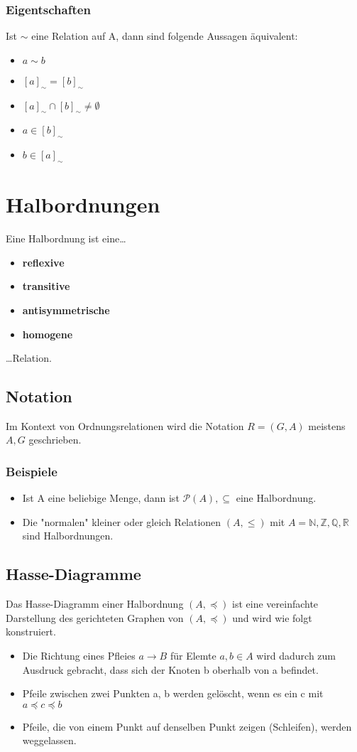 \subsubsection{Eigentschaften}
Ist $\sim$ eine Relation auf A, dann sind folgende Aussagen äquivalent:
\begin{itemize}
    \item $a \sim b$
    \item $[a]_{\sim} = [b]_{\sim}$
    \item $[a]_{\sim} \cap [b]_{\sim} \neq \emptyset$
    \item $a \in [b]_{\sim}$
    \item $b \in [a]_{\sim}$
\end{itemize}
\section{Halbordnungen}
Eine Halbordnung ist eine\dots
\begin{itemize}
    \item \textbf{reflexive}
    \item \textbf{transitive}
    \item \textbf{antisymmetrische}
    \item \textbf{homogene}
\end{itemize}
\dots Relation.
\subsection{Notation}
Im Kontext von Ordnungsrelationen wird die Notation $R = (G,A)$ meistens $A,G$ geschrieben.
\subsubsection{Beispiele}
\begin{itemize}
    \item Ist A eine beliebige Menge, dann ist $\mathcal{P}(A),\subseteq$ eine Halbordnung.
    \item Die "normalen" kleiner oder gleich Relationen $(A,\leq)$ mit $A=\mathbb{N,Z,Q,R}$ sind Halbordnungen.
\end{itemize}
\subsection{Hasse-Diagramme}
Das Hasse-Diagramm einer Halbordnung $(A, \preceq)$ ist eine
vereinfachte Darstellung des gerichteten Graphen von $(A, \preceq)$ und
wird wie folgt konstruiert.
\begin{itemize}
    \item Die Richtung eines Pfleies $a \rightarrow B$ für Elemte $a,b \in A$ wird 
    dadurch zum Ausdruck gebracht, dass sich der Knoten b oberhalb von a befindet.
    \item Pfeile zwischen zwei Punkten a, b werden gelöscht, wenn es ein
    c mit $a \preceq c \preceq b$
    \item Pfeile, die von einem Punkt auf denselben Punkt zeigen (Schleifen), werden weggelassen.
\end{itemize}

